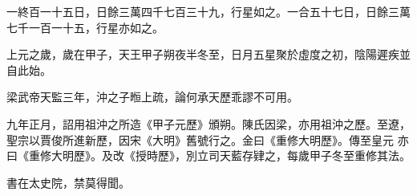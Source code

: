 \begin{pinyinscope}
 一終百一十五日，日餘三萬四千七百三十九，行星如之。一合五十七日，日餘三萬七千一百一十五，行星亦如之。



 上元之歲，歲在甲子，天王甲子朔夜半冬至，日月五星聚於虛度之初，陰陽遲疾並自此始。



 梁武帝天監三年，沖之子暅上疏，論何承天歷乖謬不可用。



 九年正月，詔用祖沖之所造《甲子元歷》頒朔。陳氏因梁，亦用祖沖之歷。至遼，聖宗以賈俊所進新歷，因宋《大明》舊號行之。金曰《重修大明歷》。傳至皇元
 亦曰《重修大明歷》。及改《授時歷》，別立司天藍存肄之，每歲甲子冬至重修其法。



 書在太史院，禁莫得聞。



\end{pinyinscope}